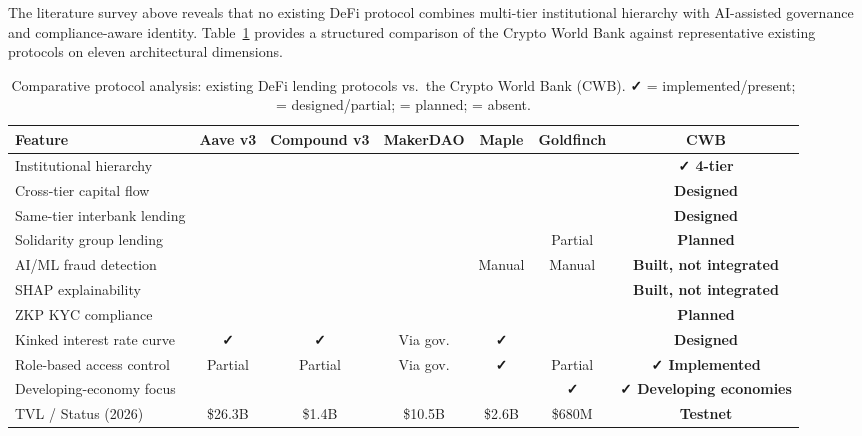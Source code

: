 \documentclass[12pt,a4paper]{report}
\newcommand{\tmarkDone}{\textbf{\faCheck}}
\newcommand{\tmarkNo}{\textbf{\faTimes}}
\newcommand{\tmarkPartial}{\faHourglassHalf}
\newcommand{\tmarkPlanned}{\textcolor{black!55}{\faCircle}}
\newcommand{\tableheadcolor}{\rowcolor{black!8}}
\newcommand{\tableheadfont}{\bfseries\small}
\begin{document}
The literature survey above reveals that no existing DeFi protocol combines multi-tier institutional hierarchy with AI-assisted governance and compliance-aware identity. Table~\ref{tab:protocol-comparison} provides a structured comparison of the Crypto World Bank against representative existing protocols on eleven architectural dimensions.

\begin{table}[H]
\centering
\caption{Comparative protocol analysis: existing DeFi lending protocols vs.\ the Crypto World Bank (CWB). {\normalfont \tmarkDone{} = implemented/present; \tmarkPartial{} = designed/partial; \tmarkPlanned{} = planned; \tmarkNo{} = absent.}}
\label{tab:protocol-comparison}
\renewcommand{\arraystretch}{1.25}
\small
\begin{tabular}{@{}p{4.2cm}ccccc>{\bfseries}c@{}}
\toprule
\tableheadcolor
\tableheadfont Feature & \tableheadfont Aave v3 & \tableheadfont Compound v3 & \tableheadfont MakerDAO & \tableheadfont Maple & \tableheadfont Goldfinch & \tableheadfont CWB \\
\midrule
Institutional hierarchy & \tmarkNo{} & \tmarkNo{} & \tmarkNo{} & \tmarkNo{} & \tmarkNo{} & \tmarkDone{} 4-tier \\
\rowcolor{RowShade}
Cross-tier capital flow & \tmarkNo{} & \tmarkNo{} & \tmarkNo{} & \tmarkNo{} & \tmarkNo{} & \tmarkPartial{} Designed \\
Same-tier interbank lending & \tmarkNo{} & \tmarkNo{} & \tmarkNo{} & \tmarkNo{} & \tmarkNo{} & \tmarkPartial{} Designed \\
\rowcolor{RowShade}
Solidarity group lending & \tmarkNo{} & \tmarkNo{} & \tmarkNo{} & \tmarkNo{} & Partial & \tmarkPlanned{} Planned \\
AI/ML fraud detection & \tmarkNo{} & \tmarkNo{} & \tmarkNo{} & Manual & Manual & \tmarkPartial{} Built, not integrated \\
\rowcolor{RowShade}
SHAP explainability & \tmarkNo{} & \tmarkNo{} & \tmarkNo{} & \tmarkNo{} & \tmarkNo{} & \tmarkPartial{} Built, not integrated \\
ZKP KYC compliance & \tmarkNo{} & \tmarkNo{} & \tmarkNo{} & \tmarkNo{} & \tmarkNo{} & \tmarkPlanned{} Planned \\
\rowcolor{RowShade}
Kinked interest rate curve & \tmarkDone{} & \tmarkDone{} & Via gov. & \tmarkDone{} & \tmarkNo{} & \tmarkPartial{} Designed \\
Role-based access control & Partial & Partial & Via gov. & \tmarkDone{} & Partial & \tmarkDone{} Implemented \\
\rowcolor{RowShade}
Developing-economy focus & \tmarkNo{} & \tmarkNo{} & \tmarkNo{} & \tmarkNo{} & \tmarkDone{} & \tmarkDone{} Developing economies \\
TVL / Status (2026) & \$26.3B & \$1.4B & \$10.5B & \$2.6B & \$680M & Testnet \\
\bottomrule
\end{tabular}
\end{table}
\end{document}
